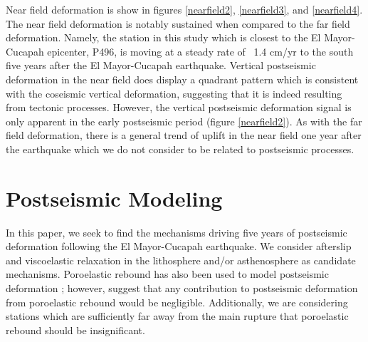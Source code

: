 \documentclass[12pt]{article}
\begin{document}
Near field deformation is show in figures \ref{nearfield2}, \ref{nearfield3}, and \ref{nearfield4}.  The near field deformation is notably sustained when compared to the far field deformation.  Namely, the station in this study which is closest to the El Mayor-Cucapah epicenter, P496, is moving at a steady rate of ~1.4 cm/yr to the south five years after the El Mayor-Cucapah earthquake.  Vertical postseismic deformation in the near field does display a quadrant pattern which is consistent with the coseismic vertical deformation, suggesting that it is indeed resulting from tectonic processes.  However, the vertical postseismic deformation signal is only apparent in the early postseismic period (figure \ref{nearfield2}).  As with the far field deformation, there is a general trend of uplift in the near field one year after the earthquake which we do not consider to be related to postseismic processes.  

\section*{Postseismic Modeling}

In this paper, we seek to find the mechanisms driving five years of postseismic deformation following the El Mayor-Cucapah earthquake. We consider afterslip and viscoelastic relaxation in the lithosphere and/or asthenosphere as candidate mechanisms.  Poroelastic rebound has also been used to model postseismic deformation \cite{Jonsson2003}; however, \cite{Gonzalez-ortega2014} suggest that any contribution to postseismic deformation from poroelastic rebound would be negligible.  Additionally, we are considering stations which are sufficiently far away from the main rupture that poroelastic rebound should be insignificant.  
\end{document}
